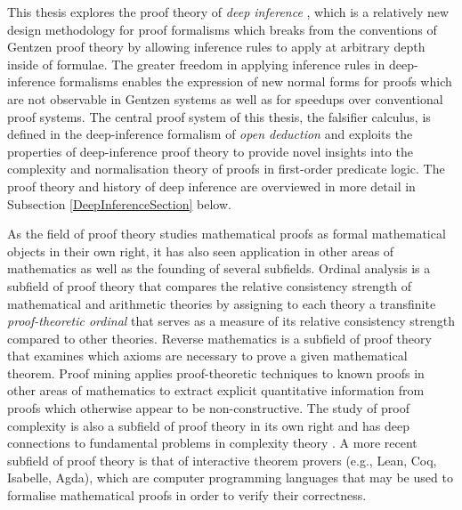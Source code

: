 \documentclass[10pt]{article}
\theoremstyle{definition}\newtheorem{remark}[theorem]{Remark}
\theoremstyle{definition}\newtheorem{example}[theorem]{Example}
\theoremstyle{definition}\newtheorem{definition}[theorem]{Definition}
\begin{document}
	This thesis explores the proof theory of \textit{deep inference} \cite{AlessioSystemOfInteractionAndStructure}, which is a relatively new design methodology for proof formalisms which breaks from the conventions of Gentzen proof theory by allowing inference rules to apply at arbitrary depth inside of formulae. The greater freedom in applying inference rules in deep-inference formalisms enables the expression of new normal forms for proofs which are not observable in Gentzen systems as well as for speedups over conventional proof systems. The central proof system of this thesis, the falsifier calculus, is defined in the deep-inference formalism of \textit{open deduction} \cite{GuglielmiGundersenParigotOpenDeduction} and exploits the properties of deep-inference proof theory to provide novel insights into the complexity and normalisation theory of proofs in first-order predicate logic. The proof theory and history of deep inference are overviewed in more detail in Subsection \ref{DeepInferenceSection} below.
	
	As the field of proof theory studies mathematical proofs as formal mathematical objects in their own right, it has also seen application in other areas of mathematics as well as the founding of several subfields. Ordinal analysis \cite{RathjenOrdinalAnalysis} is a subfield of proof theory that compares the relative consistency strength of mathematical and arithmetic theories by assigning to each theory a transfinite \textit{proof-theoretic ordinal} that serves as a measure of its relative consistency strength compared to other theories. Reverse mathematics \cite{ReverseMathematicsTextbook} is a subfield of proof theory that examines which axioms are necessary to prove a given mathematical theorem. Proof mining \cite{KohlenbachOlivaProofMiningOverview} applies proof-theoretic techniques to known proofs in other areas of mathematics to extract explicit quantitative information from proofs which otherwise appear to be non-constructive. The study of proof complexity is also a subfield of proof theory in its own right and has deep connections to fundamental problems in complexity theory \cite{CookLengthsOfProofs}. A more recent subfield of proof theory is that of interactive theorem provers (e.g., Lean, Coq, Isabelle, Agda), which are computer programming languages that may be used to formalise mathematical proofs in order to verify their correctness.
	
\end{document}
